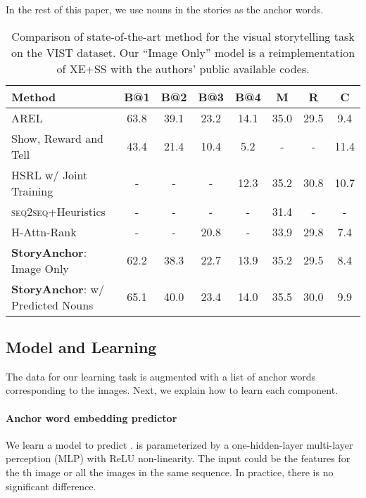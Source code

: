 In the rest of this paper, we use nouns in the stories as the anchor words.



\begin{table*}[th]
    \small
    \centering
        \begin{tabular}{l c c c c c c c}
            \toprule
            Method & B@1 & B@2 & B@3 & B@4 & M & R & C  \\
            \midrule
            AREL \cite{wang2018no} & 63.8 & 39.1 & 23.2 & 14.1 & 35.0 & 29.5 & 9.4\\
            Show, Reward and Tell \cite{wang2018show} & 43.4 & 21.4 & 10.4 & 5.2 & - & - & 11.4 \\
            HSRL w/ Joint Training \cite{huang2018hierarchically} & - & - & - & 12.3 & 35.2& 30.8 & 10.7 \\
            \textsc{seq2seq}+Heuristics~\cite{huang2016visual} & - & - & - & - & 31.4 & - & -\\
            H-Attn-Rank\cite{yu2017hierarchically} & - & - & 20.8 & - & 33.9 & 29.8 & 7.4 \\
            \textbf{StoryAnchor}: Image Only & 62.2 \tiny  & 38.3 \tiny  & 22.7 \tiny  & 13.9 \tiny  & 35.2 \tiny  & 29.5 \tiny  & 8.4 \tiny  \\
            \textbf{StoryAnchor}: w/ Predicted Nouns & 65.1 \tiny  & 40.0 \tiny  & 23.4 \tiny  & 14.0 \tiny  & 35.5 \tiny  & 30.0 \tiny  & 9.9 \tiny  \\
            \bottomrule
        \end{tabular}
    \caption{Comparison of  state-of-the-art method for the visual storytelling task on the VIST dataset. Our ``Image Only'' model is a reimplementation of XE+SS \cite{wang2018no} with the authors' public available codes.}
    \label{tab:SOTA}
    \vspace {-15pt}
\end{table*}


\subsection{Model and Learning}
\label{hwpred}

The data for our learning task is augmented with a list of anchor words  corresponding to the images. Next, we explain how to learn each component.

\vspace{-10pt}

\paragraph{Anchor word embedding predictor} We learn a model  to predict .  is parameterized by a  one-hidden-layer multi-layer perception (MLP) with ReLU non-linearity. The input could be the features for the th image or all the images in the same sequence. In practice, there is no significant difference.


